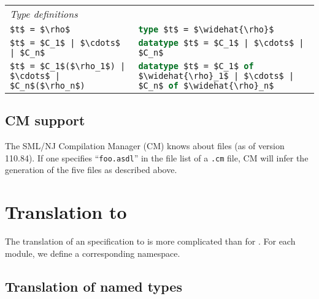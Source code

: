 \begin{table}[tp]
\begin{center}
\begin{tabular}{|l|p{3in}|}
      \hline
      \textit{Type definitions} & \\[0.25em]
      \lstinline[language=ASDL,mathescape=true]@$t$ = $\rho$@
        & \lstinline[language=SML,mathescape=true]!type $t$ = $\widehat{\rho}$! \\[0.5em]
      \lstinline[language=ASDL,mathescape=true]@$t$ = $C_1$ | $\cdots$ | $C_n$@
        & \lstinline[language=SML,mathescape=true]!datatype $t$ = $C_1$ | $\cdots$ | $C_n$! \\[0.5em]
      \lstinline[language=ASDL,mathescape=true]@$t$ = $C_1$($\rho_1$) | $\cdots$ | $C_n$($\rho_n$)@
        & \lstinline[language=SML,mathescape=true]!datatype $t$ = $C_1$ of $\widehat{\rho}_1$ | $\cdots$ | $C_n$ of $\widehat{\rho}_n$! \\[0.25em]
      \hline
    \end{tabular}%
  \end{center}%
\end{table}%

\subsection{CM support}
The SML/NJ Compilation Manager (CM) knows about \asdl{} files (as of version 110.84).
If one specifies ``\texttt{foo.asdl}'' in the file list of a \texttt{.cm} file, CM will
infer the generation of the five \sml{} files as described above.

\section{Translation to \Cplusplus{}}

The translation of an \asdl{} specification to \Cplusplus{} is more complicated than for \sml{}.
For each \asdl{} module, we define a corresponding \Cplusplus{} namespace.

\subsection{Translation of named types}

